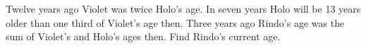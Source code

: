 Twelve years ago Violet was twice Holo's age. In seven years Holo will be 13 years older than one third of Violet's age then. Three years ago Rindo's age was the sum of Violet's and Holo's ages then. Find Rindo's current age.
